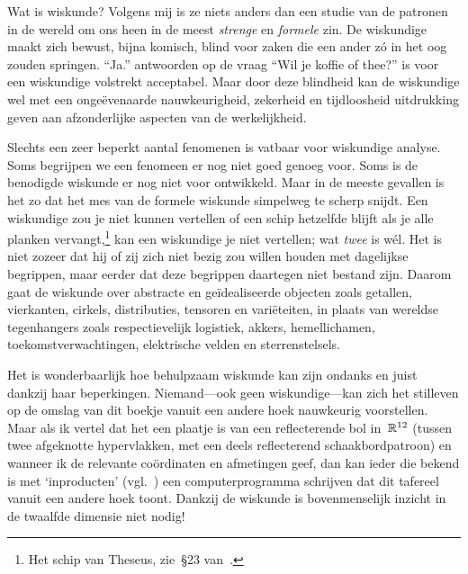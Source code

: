 \documentclass[b5paper]{book}
\begin{document}
\backmatter

\fancyfoot[CE]{}
\fancyfoot[CO]{}

\printindex

\begingroup
\renewcommand\chapter[2]{\backmattertitle{Bibliography}}
{}
\endgroup




Wat is wiskunde? Volgens mij is ze niets anders dan een studie van de patronen
in de wereld om ons heen in de meest \emph{strenge} en 
\emph{formele} zin.
De wiskundige
maakt zich  bewust, bijna komisch, blind 
voor zaken die een ander z\'o in het oog zouden springen.
``Ja.'' antwoorden op de vraag ``Wil je koffie of thee?'' is voor
een wiskundige volstrekt acceptabel.
Maar door deze blindheid kan de wiskundige wel
met een onge\"evenaarde nauwkeurigheid,
zekerheid en tijdloosheid
uitdrukking geven aan afzonderlijke  aspecten van de werkelijkheid.

Slechts een zeer beperkt aantal fenomenen
is vatbaar voor wiskundige analyse.
Soms begrijpen we een fenomeen er nog niet goed genoeg voor.
Soms is de benodigde wiskunde er nog niet voor ontwikkeld.
Maar in de meeste gevallen is het zo dat
het mes van de formele wiskunde simpelweg te scherp snijdt. 
Een wiskundige zou je niet kunnen vertellen
of een schip hetzelfde blijft als je alle planken vervangt,\footnote{Het schip
van Theseus, zie~\S23 van~\cite{theseus}.}
kan een wiskundige je niet vertellen;
wat \emph{twee} is w\'el.
Het is niet zozeer dat hij of zij zich niet bezig zou willen houden
met dagelijkse begrippen, maar eerder dat deze begrippen daartegen niet
bestand zijn.
Daarom gaat de wiskunde over abstracte en ge\"idealiseerde 
objecten zoals getallen, vierkanten, cirkels, distributies,
tensoren en vari\"eteiten,
in plaats van wereldse tegenhangers zoals
respectievelijk
logistiek, akkers, hemellichamen, toekomstverwachtingen,
elektrische velden en sterrenstelsels.

Het is wonderbaarlijk hoe behulpzaam
wiskunde kan zijn ondanks en juist dankzij haar
beperkingen.
Niemand---ook geen wiskundige---kan zich het stilleven 
op de omslag van dit boekje vanuit een andere hoek nauwkeurig voorstellen.
Maar als ik vertel dat het een plaatje is van
een reflecterende bol in~$\mathbb{R}^{12}$
(tussen twee afgeknotte hypervlakken, met een deels reflecterend 
schaakbordpatroon) en wanneer ik 
de relevante co\"ordinaten en afmetingen geef, dan
kan ieder die bekend is met `inproducten' (vgl.~)
een computerprogramma schrijven dat
dit tafereel vanuit een andere hoek toont.
Dankzij de wiskunde
is bovenmenselijk inzicht in de twaalfde dimensie niet nodig!
\end{document}

